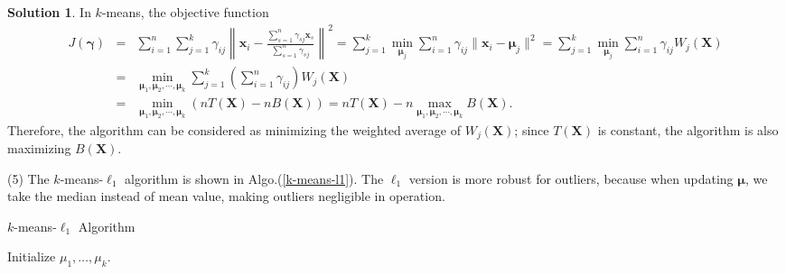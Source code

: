 \documentclass[a4paper,UTF8]{article}
\numberwithin{equation}{section}
\theoremstyle{definition}
\newtheorem*{solution}{Solution}
\begin{document}
\begin{solution}
In $k$-means, the objective function
\begin{eqnarray}
J(\bm\gamma) &=& \sum_{i=1}^n\sum_{j=1}^k  \gamma_{ij}\left\|\bm x_i - \frac{\sum_{s=1}^n\gamma_{sj}\bm x_s}{\sum_{s=1}^n\gamma_{sj}}\right\|^2=\sum_{j=1}^k\min_{\bm\mu_j}\sum_{i=1}^n\gamma_{ij}\|\bm x_i-\bm\mu_j\|^2=\sum_{j=1}^k\min_{\bm\mu_j}\sum_{i=1}^n\gamma_{ij}W_j(\bm X)\nonumber\\
&=&\min_{\bm\mu_1, \bm\mu_2,\cdots, \bm\mu_k}\sum_{j=1}^k\left(\sum_{i=1}^n\gamma_{ij}\right)W_j(\bm X)\nonumber\\
&=&\min_{\bm\mu_1, \bm\mu_2,\cdots, \bm\mu_k}(nT(\bm X)-nB(\bm X))=nT(\bm X)-n\max_{\bm\mu_1, \bm\mu_2,\cdots, \bm\mu_k}B(\bm X).
\end{eqnarray}
Therefore, the algorithm can be considered as minimizing the weighted average of $W_j(\bm X)$; since $T(\bm X)$ is constant, the algorithm is also maximizing $B(\bm X)$.

\item[(5)] The $k$-means-$\ell_1$ algorithm is shown in Algo.(\ref{k-means-l1}). The $\ell_1$ version is more robust for outliers, because when updating $\bm\mu$,  we take the median instead of mean value, making outliers negligible in operation.

\begin{algorithm}[hb]
\label{k-means-l1}
\caption{$k$-means-$\ell_1$ Algorithm}
\setcounter{AlgoLine}{0}
Initialize $\mu_1, \ldots, \mu_k$.\\
\end{algorithm}
\end{solution}
\end{document}

